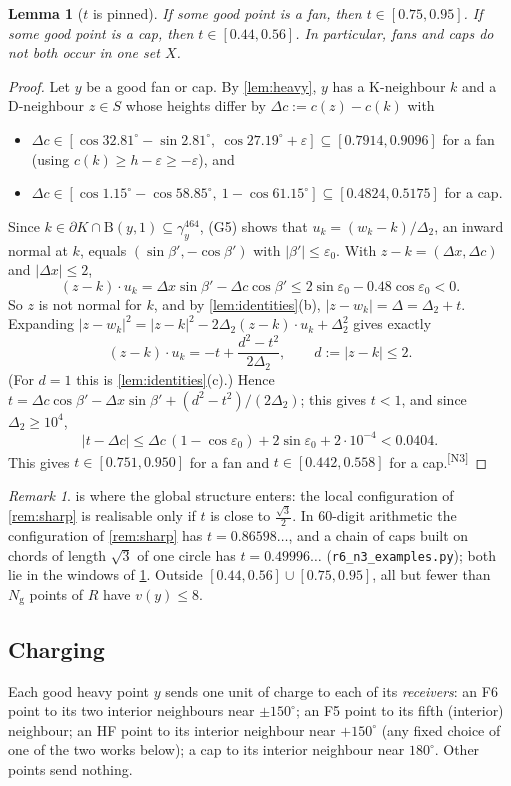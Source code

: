 \documentclass[11pt]{amsart}
\newtheorem{lemma}[theorem]{Lemma}
\theoremstyle{definition}
\theoremstyle{remark}
\newtheorem{remark}[theorem]{Remark}
\newcommand{\Dt}{\Delta_2}
\newcommand{\eps}{\varepsilon}
\newcommand{\Dd}{\mathrm{B}}      %
\newcommand{\chk}[1]{\textsuperscript{[#1]}}
\begin{document}
\begin{lemma}[$t$ is pinned]\label{lem:pin}
If some good point is a fan, then $t\in[0.75,0.95]$. If some good point is a cap, then $t\in[0.44,0.56]$. In particular, fans and caps do not both occur in one set $X$.
\end{lemma}
\begin{proof}
Let $y$ be a good fan or cap. By \cref{lem:heavy}, $y$ has a K-neighbour $k$ and a D-neighbour $z\in S$ whose heights differ by $\Delta c:=c(z)-c(k)$ with
\begin{itemize}[leftmargin=2em]
\item $\Delta c\in[\cos32.81^\circ-\sin2.81^\circ,\ \cos27.19^\circ+\eps]\subseteq[0.7914,0.9096]$ for a fan (using $c(k)\ge h-\eps\ge-\eps$), and
\item $\Delta c\in[\cos1.15^\circ-\cos58.85^\circ,\ 1-\cos61.15^\circ]\subseteq[0.4824,0.5175]$ for a cap.
\end{itemize}
Since $k\in\partial K\cap\Dd(y,1)\subseteq\gamma_y^{464}$, (G5) shows that $u_k=(w_k-k)/\Dt$, an inward normal at $k$, equals $(\sin\beta',-\cos\beta')$ with $|\beta'|\le\eps_0$. With $z-k=(\Delta x,\Delta c)$ and $|\Delta x|\le2$,
\[
(z-k)\cdot u_k=\Delta x\sin\beta'-\Delta c\cos\beta'\le2\sin\eps_0-0.48\cos\eps_0<0 .
\]
So $z$ is not normal for $k$, and by \cref{lem:identities}(b), $|z-w_k|=\Delta=\Dt+t$. Expanding $|z-w_k|^2=|z-k|^2-2\Dt(z-k)\cdot u_k+\Dt^2$ gives exactly
\[
(z-k)\cdot u_k=-t+\frac{d^2-t^2}{2\Dt},\qquad d:=|z-k|\le2 .
\]
(For $d=1$ this is \cref{lem:identities}(c).) Hence $t=\Delta c\cos\beta'-\Delta x\sin\beta'+(d^2-t^2)/(2\Dt)$; this gives $t<1$, and since $\Dt\ge10^4$,
\[
|t-\Delta c|\le\Delta c\,(1-\cos\eps_0)+2\sin\eps_0+2\cdot10^{-4}<0.0404 .
\]
This gives $t\in[0.751,0.950]$ for a fan and $t\in[0.442,0.558]$ for a cap.\chk{N3}
\end{proof}

\begin{remark}
 is where the global structure enters: the local configuration of \cref{rem:sharp} is realisable only if $t$ is close to $\frac{\sqrt3}2$. In $60$-digit arithmetic the configuration of \cref{rem:sharp} has $t=0.86598\ldots$, and a chain of caps built on chords of length $\sqrt3$ of one circle has $t=0.49996\ldots$ (\texttt{r6\_n3\_examples.py}); both lie in the windows of \cref{lem:pin}. Outside $[0.44,0.56]\cup[0.75,0.95]$, all but fewer than $N_{\mathrm g}$ points of $R$ have $v(y)\le8$.
\end{remark}

\subsection{Charging}
Each good heavy point $y$ sends one unit of charge to each of its \emph{receivers}: an F6 point to its two interior neighbours near $\pm150^\circ$; an F5 point to its fifth (interior) neighbour; an HF point to its interior neighbour near $+150^\circ$ (any fixed choice of one of the two works below); a cap to its interior neighbour near $180^\circ$. Other points send nothing.
\end{document}
